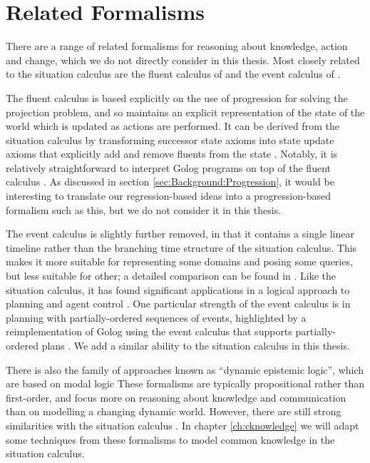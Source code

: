 \section{Related Formalisms}

\label{sec:Background:Related-Formalisms}

There are a range of related formalisms for reasoning about knowledge,
action and change, which we do not directly consider in this thesis.
Most closely related to the situation calculus are the fluent calculus
of \citet{thielscher98fluent_calculus} and the event calculus of
\citet{kowalski86event_calculus}.

The fluent calculus is based explicitly on the use of progression
for solving the projection problem, and so maintains an explicit representation
of the state of the world which is updated as actions are performed.
It can be derived from the situation calculus by transforming successor
state axioms into state update axioms that explicitly add and remove
fluents from the state \citep{thielscher99fluentcalc_from_sitcalc}.
Notably, it is relatively straightforward to interpret Golog programs
on top of the fluent calculus \citep{thielscher05golog_in_flux}.
As discussed in section \ref{sec:Background:Progression}, it would
be interesting to translate our regression-based ideas into a progression-based
formalism such as this, but we do not consider it in this thesis.

The event calculus is slightly further removed, in that it contains
a single linear timeline rather than the branching time structure
of the situation calculus. This makes it more suitable for representing
some domains and posing some queries, but less suitable for other;
a detailed comparison can be found in \citep{kowalski97reconcile_sitcalc_evtcalc,belleghem97sitcalc_evtcalc}.
Like the situation calculus, it has found significant applications
in a logical approach to planning and agent control \citep{shanahan00ec_planner}.
One particular strength of the event calculus is in planning with
partially-ordered sequences of events, highlighted by a reimplementation
of Golog using the event calculus that supports partially-ordered
plans \citep{pereira04ec_golog}. We add a similar ability to the
situation calculus in this thesis.

There is also the family of approaches known as {}``dynamic epistemic
logic'', which are based on modal logic \citep{baltag98pa_ck,vanBenthem06lcc,vanBentham06tree_of_knowledge}
These formalisms are typically propositional rather than first-order,
and focus more on reasoning about knowledge and communication than
on modelling a changing dynamic world. However, there are still strong
similarities with the situation calculus \citep{vanbentham07ml_sitcalc}.
In chapter \ref{ch:cknowledge} we will adapt some techniques from
these formalisms to model common knowledge in the situation calculus.\\


